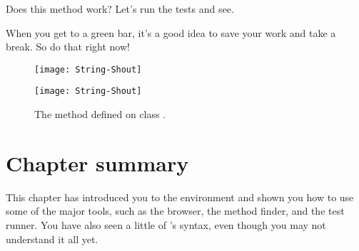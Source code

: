 \documentclass[a4paper,10pt,twoside]{book}
\begin{document}
Does this method work?  Let's run the tests and see.

When you get to a green bar\footnotemark, it's a good idea to save your work and take a break.  
So do that right now!

\begin{figure}[hbt]
\ifluluelse
	{\centerline{\texttt{[image: String-Shout]}}}
	{\centerline{\texttt{[image: String-Shout]}}}
\caption{The  method defined on class .
}
\end{figure}

\section{Chapter summary}
This chapter has introduced you to the \pharo environment and shown you how to use some of the major tools, such as the browser, the method finder, and the test runner.   You have also seen a little of \pharo's syntax, even though you may not understand it all yet.
\end{document}

